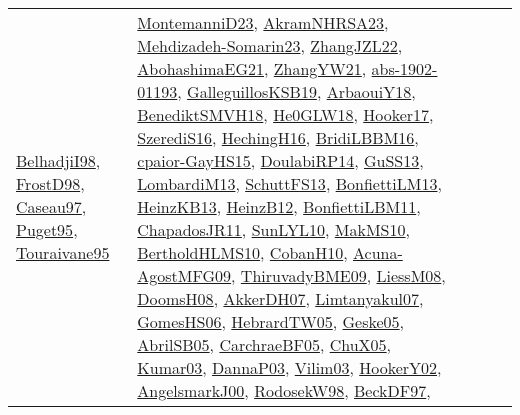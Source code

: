 {\begin{longtable}{lp{3cm}>{\raggedright}p{6cm}>{\raggedright}p{6cm}p{8cm}}
\href{articles/BelhadjiI98.pdf}{BelhadjiI98}\cite{BelhadjiI98}, \href{papers/FrostD98.pdf}{FrostD98}\cite{FrostD98}, \href{papers/Caseau97.pdf}{Caseau97}\cite{Caseau97}, \href{papers/Puget95.pdf}{Puget95}\cite{Puget95}, \href{papers/Touraivane95.pdf}{Touraivane95}\cite{Touraivane95} & \href{articles/MontemanniD23.pdf}{MontemanniD23}\cite{MontemanniD23}, \href{articles/AkramNHRSA23.pdf}{AkramNHRSA23}\cite{AkramNHRSA23}, \href{papers/Mehdizadeh-Somarin23.pdf}{Mehdizadeh-Somarin23}\cite{Mehdizadeh-Somarin23}, \href{papers/ZhangJZL22.pdf}{ZhangJZL22}\cite{ZhangJZL22}, \href{articles/AbohashimaEG21.pdf}{AbohashimaEG21}\cite{AbohashimaEG21}, \href{articles/ZhangYW21.pdf}{ZhangYW21}\cite{ZhangYW21}, \href{articles/abs-1902-01193.pdf}{abs-1902-01193}\cite{abs-1902-01193}, \href{papers/GalleguillosKSB19.pdf}{GalleguillosKSB19}\cite{GalleguillosKSB19}, \href{papers/ArbaouiY18.pdf}{ArbaouiY18}\cite{ArbaouiY18}, \href{papers/BenediktSMVH18.pdf}{BenediktSMVH18}\cite{BenediktSMVH18}, \href{papers/He0GLW18.pdf}{He0GLW18}\cite{He0GLW18}, \href{papers/Hooker17.pdf}{Hooker17}\cite{Hooker17}, \href{papers/SzerediS16.pdf}{SzerediS16}\cite{SzerediS16}, \href{papers/HechingH16.pdf}{HechingH16}\cite{HechingH16}, \href{papers/BridiLBBM16.pdf}{BridiLBBM16}\cite{BridiLBBM16}, \href{papers/cpaior-GayHS15.pdf}{cpaior-GayHS15}\cite{cpaior-GayHS15}, \href{papers/DoulabiRP14.pdf}{DoulabiRP14}\cite{DoulabiRP14}, \href{papers/GuSS13.pdf}{GuSS13}\cite{GuSS13}, \href{papers/LombardiM13.pdf}{LombardiM13}\cite{LombardiM13}, \href{papers/SchuttFS13.pdf}{SchuttFS13}\cite{SchuttFS13}, \href{papers/BonfiettiLM13.pdf}{BonfiettiLM13}\cite{BonfiettiLM13}, \href{papers/HeinzKB13.pdf}{HeinzKB13}\cite{HeinzKB13}, \href{papers/HeinzB12.pdf}{HeinzB12}\cite{HeinzB12}, \href{papers/BonfiettiLBM11.pdf}{BonfiettiLBM11}\cite{BonfiettiLBM11}, \href{papers/ChapadosJR11.pdf}{ChapadosJR11}\cite{ChapadosJR11}, \href{papers/SunLYL10.pdf}{SunLYL10}\cite{SunLYL10}, \href{papers/MakMS10.pdf}{MakMS10}\cite{MakMS10}, \href{papers/BertholdHLMS10.pdf}{BertholdHLMS10}\cite{BertholdHLMS10}, \href{papers/CobanH10.pdf}{CobanH10}\cite{CobanH10}, \href{papers/Acuna-AgostMFG09.pdf}{Acuna-AgostMFG09}\cite{Acuna-AgostMFG09}, \href{papers/ThiruvadyBME09.pdf}{ThiruvadyBME09}\cite{ThiruvadyBME09}, \href{articles/LiessM08.pdf}{LiessM08}\cite{LiessM08}, \href{papers/DoomsH08.pdf}{DoomsH08}\cite{DoomsH08}, \href{papers/AkkerDH07.pdf}{AkkerDH07}\cite{AkkerDH07}, \href{papers/Limtanyakul07.pdf}{Limtanyakul07}\cite{Limtanyakul07}, \href{papers/GomesHS06.pdf}{GomesHS06}\cite{GomesHS06}, \href{papers/HebrardTW05.pdf}{HebrardTW05}\cite{HebrardTW05}, \href{papers/Geske05.pdf}{Geske05}\cite{Geske05}, \href{papers/AbrilSB05.pdf}{AbrilSB05}\cite{AbrilSB05}, \href{papers/CarchraeBF05.pdf}{CarchraeBF05}\cite{CarchraeBF05}, \href{papers/ChuX05.pdf}{ChuX05}\cite{ChuX05}, \href{papers/Kumar03.pdf}{Kumar03}\cite{Kumar03}, \href{papers/DannaP03.pdf}{DannaP03}\cite{DannaP03}, \href{papers/Vilim03.pdf}{Vilim03}\cite{Vilim03}, \href{papers/HookerY02.pdf}{HookerY02}\cite{HookerY02}, \href{papers/AngelsmarkJ00.pdf}{AngelsmarkJ00}\cite{AngelsmarkJ00}, \href{papers/RodosekW98.pdf}{RodosekW98}\cite{RodosekW98}, \href{papers/BeckDF97.pdf}{BeckDF97}\cite{BeckDF97}, 
\end{longtable}}
